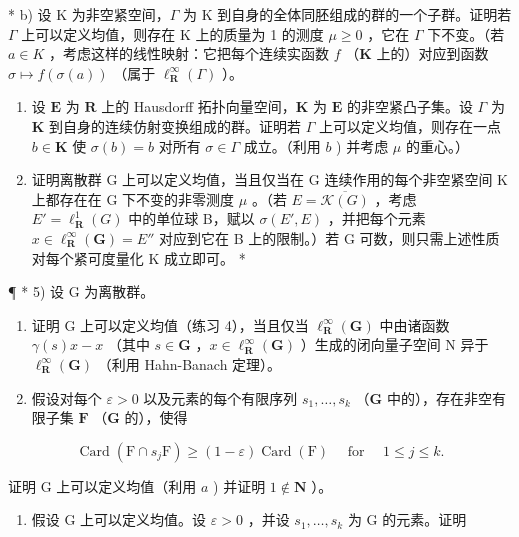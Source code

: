 * b) 设 K 为非空紧空间，\(\Gamma\) 为 K 到自身的全体同胚组成的群的一个子群。证明若 \(\Gamma\) 上可以定义均值，则存在 K 上的质量为 1 的测度 \(\mu \geqslant 0\) ，它在 \(\Gamma\) 下不变。（若 \(a \in K\) ，考虑这样的线性映射：它把每个连续实函数 \(f\) （\(\mathbf{K}\) 上的）对应到函数 \(\sigma \mapsto f(\sigma(a))\) （属于 \(\ell_{\mathbf{R}}^{\infty}(\Gamma)\) ）。

\begin{enumerate}
\def\labelenumi{\alph{enumi})}
\setcounter{enumi}{2}
\item
  设 \(\mathbf{E}\) 为 \(\mathbf{R}\) 上的 Hausdorff 拓扑向量空间，\(\mathbf{K}\) 为 \(\mathbf{E}\) 的非空紧凸子集。设 \(\Gamma\) 为 \(\mathbf{K}\) 到自身的连续仿射变换组成的群。证明若 \(\Gamma\) 上可以定义均值，则存在一点 \(b \in \mathbf{K}\) 使 \(\sigma(b) = b\) 对所有 \(\sigma \in \Gamma\) 成立。（利用 \(b\) ) 并考虑 \(\mu\) 的重心。）
\item
  证明离散群 G 上可以定义均值，当且仅当在 G 连续作用的每个非空紧空间 K 上都存在在 G 下不变的非零测度 \(\mu\) 。（若 \(E = \overline{\mathcal{K}(G)}\) ，考虑 \(E' = \ell_{\mathbf{R}}^{1}(G)\) 中的单位球 B，赋以 \(\sigma(E', E)\) ，并把每个元素 \(x \in \ell_{\mathbf{R}}^{\infty}(\mathbf{G}) = E''\) 对应到它在 B 上的限制。）若 G 可数，则只需上述性质对每个紧可度量化 K 成立即可。 *
\end{enumerate}

¶ * 5) 设 G 为离散群。

\begin{enumerate}
\def\labelenumi{\alph{enumi})}
\item
  证明 G 上可以定义均值（练习 4），当且仅当 \(\ell_{\mathbf{R}}^{\infty}(\mathbf{G})\) 中由诸函数 \(\gamma(s)x - x\) （其中 \(s \in \mathbf{G}\) ，\(x \in \ell_{\mathbf{R}}^{\infty}(\mathbf{G})\) ）生成的闭向量子空间 N 异于 \(\ell_{\mathbf{R}}^{\infty}(\mathbf{G})\) （利用 Hahn-Banach 定理）。
\item
  假设对每个 \(\varepsilon > 0\) 以及元素的每个有限序列 \(s_1, \ldots, s_k\) （\(\mathbf{G}\) 中的），存在非空有限子集 \(\mathbf{F}\) （\(\mathbf{G}\) 的），使得
\end{enumerate}

\[
\operatorname{Card} (\mathrm{F} \cap s _ {j} \mathrm{F}) \geqslant (1 - \varepsilon) \operatorname{Card} (\mathrm{F}) \quad \text { for } \quad 1 \leqslant j \leqslant k.
\]

证明 G 上可以定义均值（利用 \(a\) ) 并证明 \(1 \notin \mathbf{N}\) ）。

\begin{enumerate}
\def\labelenumi{\alph{enumi})}
\setcounter{enumi}{2}
\tightlist
\item
  假设 G 上可以定义均值。设 \(\varepsilon > 0\) ，并设 \(s_1, \ldots, s_k\) 为 G 的元素。证明
\end{enumerate}

